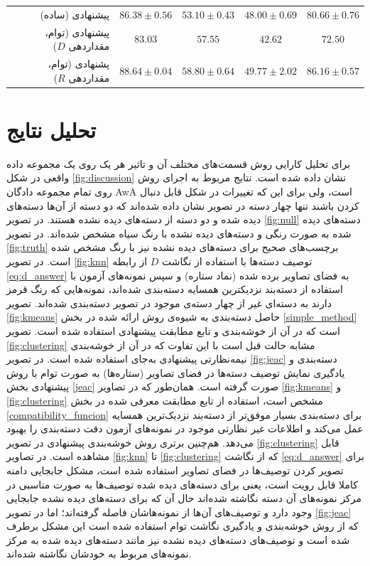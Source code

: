\begin{table}[ht]
{\begin{tabular}{|r|r|c|c|c|c|}
& پیشنهادی (ساده)
                        & $86.38 \pm 0.56$              & $ 53.10\pm 0.43 $             & $48.00 \pm 0.69$              &$ 80.66 \pm 0.76$ \\
& پیشنهادی (توام، مقداردهی $D$)
                     & $83.03$                        & $57.55$                       & $42.62$          & $72.50$\\
& پشنهادی (توام، مقداردهی $R$)
                     & \textbf{\em $88.64 \pm 0.04$}  & \textbf{\em $58.80 \pm 0.64$} & $49.77 \pm 2.02$ & \textbf{\em $86.16 \pm 0.57$} \\
\hline
\end{tabular}
}
\end{table}

\section{تحلیل نتایج}\label{exp:discussion}
برای تحلیل کارایی روش قسمت‌های مختلف آن و تاثیر هر یک  روی یک مجموعه داده واقعی در شکل
\ref{fig:discussion}
 نشان داده شده است. نتایج مربوط به اجرای روش روی تمام مجموعه دادگان AwA است، ولی برای این که تغییرات در شکل قابل دنبال کردن باشند تنها چهار دسته در  تصویر نشان داده شده‌اند که دو دسته از آن‌ها دسته‌های دیده شده و دو دسته از دسته‌های دیده نشده هستند. در تصویر
\ref{fig:null}
دسته‌های دیده شده به صورت رنگی و دسته‌های دیده نشده با رنگ سیاه مشخص شده‌اند. در تصویر
\ref{fig:truth}
برچسب‌های صحیح برای دسته‌های دیده نشده نیز با رنگ مشخص شده است. در تصویر
\ref{fig:knn}
توصیف دسته‌ها با استفاده از نگاشت $D$ از رابطه \eqref{eq:d_answer} به فضای تصاویر برده شده (نماد ستاره) و سپس نمونه‌های آزمون با استفاده از دسته‌بند نزدیکترین همسایه دسته‌بندی شده‌اند، نمونه‌هایی که رنگ قرمز دارند به دسته‌ای غیر از چهار دسته‌ی موجود در تصویر دسته‌بندی شده‌اند. تصویر
\ref{fig:kmeans}
حاصل دسته‌بندی به شیوه‌ی روش ارائه شده در بخش \ref{simple_method} است که در آن از خوشه‌بندی  و تابع مطابقت پیشنهادی استفاده شده است. تصویر
\ref{fig:clustering}
مشابه حالت قبل است با این تفاوت که در آن از خوشه‌بندی نیمه‌نظارتی پیشنهادی به‌جای  استفاده شده است. در تصویر
\ref{fig:jeac}
دسته‌بندی و یادگیری نمایش توصیف دسته‌ها در فضای تصاویر (ستاره‌ها) به صورت توام با روش پیشنهادی بخش \ref{jeac} صورت گرفته است.
همان‌طور که در تصاویر
\ref{fig:kmeans} و \ref{fig:clustering}
مشخص است، استفاده از  تابع مطابقت معرفی شده در بخش \ref{compatibility_funcion} برای دسته‌بندی بسیار موفق‌تر از دسته‌بند نزدیک‌ترین همسایه عمل می‌کند و اطلاعات غیر نظارتی موجود در نمونه‌های آزمون دقت  دسته‌بندی را بهبود می‌دهد. هم‌چنین برتری روش خوشه‌بندی پیشنهادی در تصویر \ref{fig:clustering} قابل مشاهده است. در تصاویر \ref{fig:knn} تا \ref{fig:clustering} که از نگاشت  \eqref{eq:d_answer} برای تصویر کردن توصیف‌ها در فضای تصاویر استفاده شده است، مشکل جابجایی دامنه کاملا قابل رویت است، یعنی برای دسته‌های دیده شده توصیف‌ها به صورت مناسبی در مرکز نمونه‌های آن دسته نگاشته شده‌اند حال آن که برای دسته‌های دیده نشده جابجایی وجود دارد و توصیف‌های آن‌ها از نمونه‌هاشان فاصله گرفته‌اند؛ اما در تصویر
\ref{fig:jeac}
که از روش خوشه‌بندی و یادگیری نگاشت توام استفاده شده است این مشکل برطرف شده است و توصیف‌های دسته‌های دیده نشده نیز مانند دسته‌های دیده شده به مرکز نمونه‌های مربوط به خودشان نگاشته شده‌اند.

